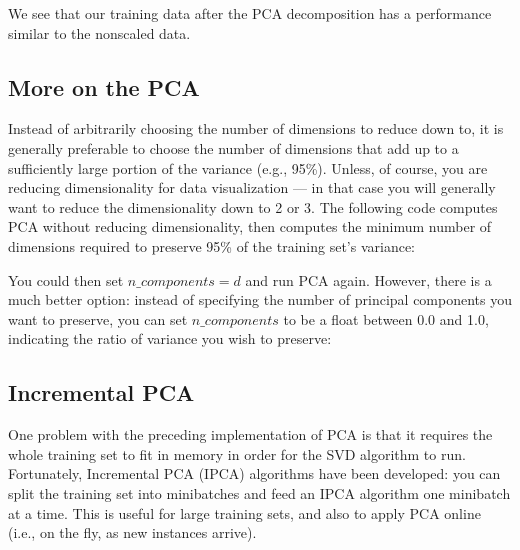 \documentclass[letterpaper,10pt,english]{sphinxmanual}
\begin{document}
We see that our training data after the PCA decomposition has a performance similar to the non\sphinxhyphen{}scaled data.


\subsection{More on the PCA}
\label{\detokenize{chapter8:more-on-the-pca}}
Instead of arbitrarily choosing the number of dimensions to reduce down to, it is generally preferable to
choose the number of dimensions that add up to a sufficiently large portion of the variance (e.g., 95\%).
Unless, of course, you are reducing dimensionality for data visualization — in that case you will
generally want to reduce the dimensionality down to 2 or 3.
The following code computes PCA without reducing dimensionality, then computes the minimum number
of dimensions required to preserve 95\% of the training set’s variance:

\begin{sphinxVerbatim}[commandchars=\\\{\}]
  
  
      
\end{sphinxVerbatim}

You could then set \(n\_components=d\) and run PCA again. However, there is a much better option: instead
of specifying the number of principal components you want to preserve, you can set \(n\_components\) to be
a float between 0.0 and 1.0, indicating the ratio of variance you wish to preserve:

\begin{sphinxVerbatim}[commandchars=\\\{\}]
  
  
\end{sphinxVerbatim}


\subsection{Incremental PCA}
\label{\detokenize{chapter8:incremental-pca}}
One problem with the preceding implementation of PCA is that it requires the whole training set to fit in
memory in order for the SVD algorithm to run. Fortunately, Incremental PCA (IPCA) algorithms have
been developed: you can split the training set into mini\sphinxhyphen{}batches and feed an IPCA algorithm one minibatch
at a time. This is useful for large training sets, and also to apply PCA online (i.e., on the fly, as new
instances arrive).
\end{document}
